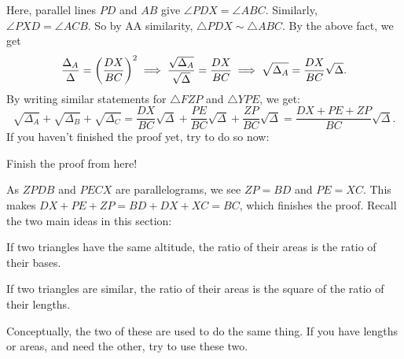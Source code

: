 \documentclass[11pt,paper=letter]{scrartcl}
\begin{document}
Here, parallel lines $PD$ and $AB$ give $\angle PDX = \angle ABC$. Similarly, $\angle PXD = \angle ACB$. So by AA similarity, $\triangle PDX \sim \triangle ABC$. By the above fact, we get $$\frac{\Delta_A}{\Delta} = \left( \frac{DX}{BC} \right)^2 \implies \frac{\sqrt{\Delta_A}}{\sqrt{\Delta}} = \frac{DX}{BC} \implies \sqrt{\Delta_A} = \frac{DX}{BC}\sqrt{\Delta}.$$
By writing similar statements for $\triangle FZP$ and $\triangle YPE$, we get:
$$\sqrt{\Delta_A} + \sqrt{\Delta_B} + \sqrt{\Delta_C} = \frac{DX}{BC} \sqrt{\Delta} + \frac{PE}{BC} \sqrt{\Delta} + \frac{ZP}{BC} \sqrt{\Delta} = \frac{DX + PE + ZP}{BC} \sqrt{\Delta}.$$ If you haven't finished the proof yet, try to do so now:
\begin{exboxed}
  Finish the proof from here!
\end{exboxed}
As $ZPDB$ and $PECX$ are parallelograms, we see $ZP = BD$ and $PE = XC$. This makes $DX + PE + ZP = BD + DX + XC = BC$, which finishes the proof. 
\newpage
Recall the two main ideas in this section:
\begin{enumthin}
  \item If two triangles have the same altitude, the ratio of their areas is the ratio of their bases.
  \item If two triangles are similar, the ratio of their areas is the square of the ratio of their lengths.
\end{enumthin}
Conceptually, the two of these are used to do the same thing.  If you have lengths or areas, and need the other, try to use these two.
\end{document}

